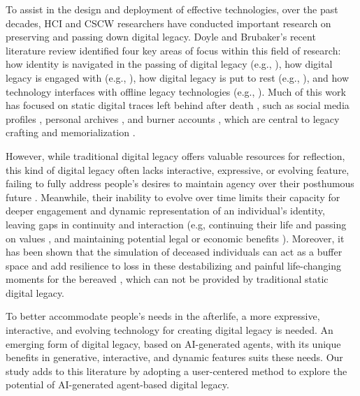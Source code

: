 To assist in the design and deployment of effective technologies, over the past decades, HCI and CSCW researchers have conducted important research on preserving and passing down digital legacy. Doyle and Brubaker's recent literature review \cite{doyle2023digital} identified four key areas of focus within this field of research: how identity is navigated in the passing of digital legacy (e.g., \cite{gulotta2014legacy, kaye2006have, thomas2014older}), how digital legacy is engaged with (e.g., \cite{gach2020experiences, massimi2011matters, brubaker2014stewarding, brubaker2016legacy}), how digital legacy is put to rest (e.g., \cite{gulotta2016engaging, kirk2010human, jamison2016ps}), and how technology interfaces with offline legacy technologies (e.g., \cite{odom2012technology, uriu2021floral, uriu2021generating}). Much of this work has focused on static digital traces left behind after death \cite{morris2024generative}, such as social media profiles \cite{brubaker2016legacy, brubaker2014stewarding, brubaker2011we, brubaker2019orienting, gach2020experiences, gach2021getting, getty2011said, mori2012design}, personal archives \cite{kaye2006have, she2021living}, and burner accounts \cite{gulotta2016engaging}, which are central to legacy crafting and memorialization \cite{morris2024generative}. 

However, while traditional digital legacy offers valuable resources for reflection, this kind of digital legacy often lacks interactive, expressive, or evolving feature, failing to fully address people's desires to maintain agency over their posthumous future \cite{gulotta2017digital, brubaker2024ai, morris2024generative}. Meanwhile, their inability to evolve over time limits their capacity for deeper engagement and dynamic representation of an individual's identity, leaving gaps in continuity and interaction (e.g, continuing their life and passing on values \cite{gulotta2017digital}, and maintaining potential legal or economic benefits \cite{brubaker2024ai, morris2024generative}). Moreover, it has been shown that the simulation of deceased individuals can act as a buffer space and add resilience to loss in these destabilizing and painful life-changing moments for the bereaved \cite{xygkou2023conversation}, which can not be provided by traditional static digital legacy. 

To better accommodate people's needs in the afterlife, a more expressive, interactive, and evolving technology for creating digital legacy is needed. An emerging form of digital legacy, based on AI-generated agents, with its unique benefits in generative, interactive, and dynamic features suits these needs. Our study adds to this literature by adopting a user-centered method to explore the potential of AI-generated agent-based digital legacy.

